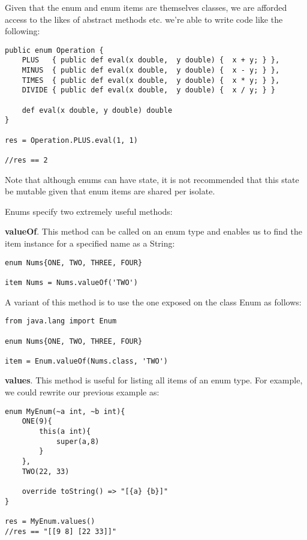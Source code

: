 \documentclass[conc-doc]{subfiles}
\begin{document}
Given that the enum and enum items are themselves classes, we are afforded access to the likes of abstract methods etc. we're able to write code like the following:
\begin{lstlisting}
public enum Operation {
	PLUS   { public def eval(x double,  y double) {  x + y; } },
	MINUS  { public def eval(x double,  y double) {  x - y; } },
	TIMES  { public def eval(x double,  y double) {  x * y; } },
	DIVIDE { public def eval(x double,  y double) {  x / y; } }
	
	def eval(x double, y double) double
}

res = Operation.PLUS.eval(1, 1)

//res == 2
\end{lstlisting}

Note that although enums can have state, it is not recommended that this state be mutable given that enum items are shared per isolate.

Enums specify two extremely useful methods:

\textbf{valueOf}. This method can be called on an enum type and enables us to find the item instance for a specified name as a String:
\begin{lstlisting}
enum Nums{ONE, TWO, THREE, FOUR}

item Nums = Nums.valueOf('TWO')
\end{lstlisting}

A variant of this method is to use the one exposed on the class Enum as follows:
\begin{lstlisting}
from java.lang import Enum

enum Nums{ONE, TWO, THREE, FOUR}

item = Enum.valueOf(Nums.class, 'TWO')
\end{lstlisting}

\textbf{values}. This method is useful for listing all items of an enum type. For example, we could rewrite our previous example as:

\begin{lstlisting}
enum MyEnum(~a int, ~b int){
	ONE(9){
		this(a int){
			super(a,8)
		}
	},
	TWO(22, 33)
	
	override toString() => "[{a} {b}]"
}

res = MyEnum.values()
//res == "[[9 8] [22 33]]"
\end{lstlisting}
\end{document}

